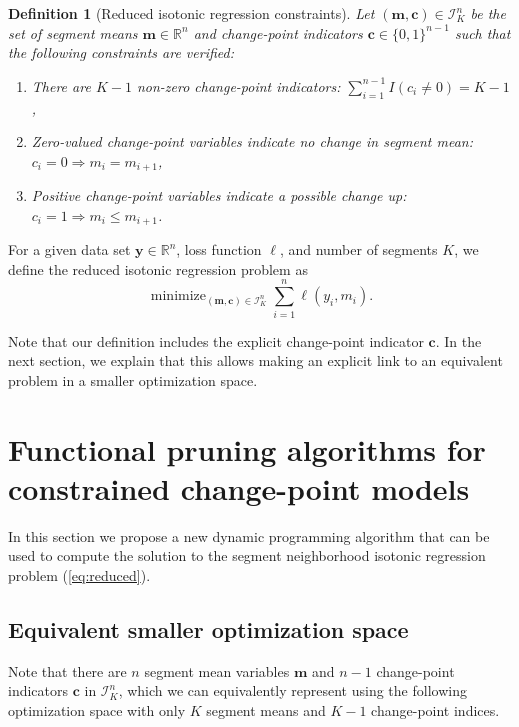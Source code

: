 \documentclass{article}
\newtheorem{definition}{Definition}
\DeclareMathOperator*{\minimize}{minimize}
\newcommand{\RR}{\mathbb R}
\begin{document}
\begin{definition}[Reduced isotonic regression constraints]
  \label{def:I}
  Let $(\mathbf m, \mathbf c)\in\mathcal I_K^n$ be the set of segment means
  $\mathbf m\in\RR^n$ and change-point indicators
  $\mathbf c\in\{0,1\}^{n-1}$ such that the following constraints are
  verified:
  \begin{enumerate}
  \item There are $K-1$ non-zero change-point indicators:
    $\sum_{i=1}^{n-1} I(c_i \neq 0) = K-1$,
  \item Zero-valued change-point variables indicate no change in
    segment mean: $c_i = 0 \Rightarrow m_i = m_{i+1}$,
  \item Positive change-point variables indicate a possible change up:
    $c_i = 1 \Rightarrow m_i \leq m_{i+1}$.
  \end{enumerate}
\end{definition}

For a given data set $\mathbf y\in\RR^n$, loss function $\ell$, and
number of segments $K$, we define the reduced isotonic regression
problem as
\begin{equation}
  \label{eq:reduced}
  \minimize_{(\mathbf m, \mathbf c)\in\mathcal I_K^n} \sum_{i=1}^n \ell(y_i, m_i).
\end{equation}

Note that our definition includes the explicit change-point indicator
$\mathbf c$. In the next section, we explain that this allows making
an explicit link to an equivalent problem in a smaller optimization
space.

\newcommand{\FCC}{C}
\newcommand{\M}{\mathcal{M}}
\section{Functional 
pruning algorithms for constrained
  change-point models}
\label{sec:algorithms}


In this section we propose a new dynamic programming algorithm that
can be used to compute the solution to the segment neighborhood
isotonic regression problem (\ref{eq:reduced}). 

\subsection{Equivalent smaller optimization space}

Note that there are $n$
segment mean variables $\mathbf m$ and $n-1$ change-point indicators
$\mathbf c$ in $\mathcal I_K^n$, which we can equivalently represent
using the following optimization space with only $K$ segment means and
$K-1$ change-point indices.
\end{document}
